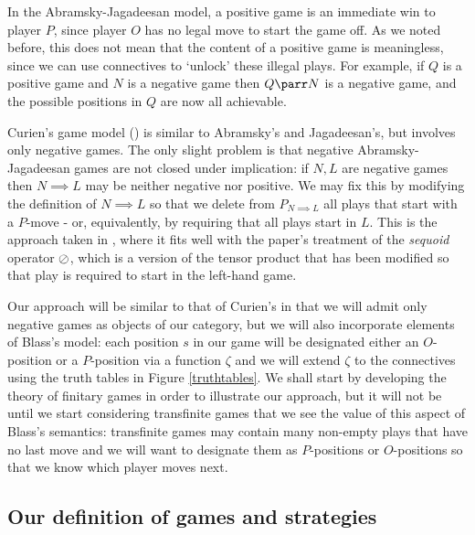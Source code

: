 \documentclass[11pt]{article} %
\begin{document}
In the Abramsky-Jagadeesan model, a positive game is an immediate win to player $P$, since player $O$ has no legal move to start the game off.  As we noted before, this does not mean that the content of a positive game is meaningless, since we can use connectives to `unlock' these illegal plays.  For example, if $Q$ is a positive game and $N$ is a negative game then $Q\parr N$ is a negative game, and the possible positions in $Q$ are now all achievable.  

Curien's game model (\cite{curiengames}) is similar to Abramsky's and Jagadeesan's, but involves only negative games.  The only slight problem is that negative Abramsky-Jagadeesan games are not closed under implication: if $N,L$ are negative games then $N\implies L$ may be neither negative nor positive.  We may fix this by modifying the definition of $N\implies L$ so that we delete from $P_{N\implies L}$ all plays that start with a $P$-move - or, equivalently, by requiring that all plays start in $L$.  This is the approach taken in \cite{martinsthesis}, where it fits well with the paper's treatment of the \emph{sequoid} operator $\oslash$, which is a version of the tensor product that has been modified so that play is required to start in the left-hand game.

Our approach will be similar to that of Curien's in that we will admit only negative games as objects of our category, but we will also incorporate elements of Blass's model: each position $s$ in our game will be designated either an $O$-position or a $P$-position via a function $\zeta$ and we will extend $\zeta$ to the connectives using the truth tables in Figure \ref{truthtables}.  We shall start by developing the theory of finitary games in order to illustrate our approach, but it will not be until we start considering transfinite games that we see the value of this aspect of Blass's semantics: transfinite games may contain many non-empty plays that have no last move and we will want to designate them as $P$-positions or $O$-positions so that we know which player moves next.  

\subsection{Our definition of games and strategies}
\end{document}
